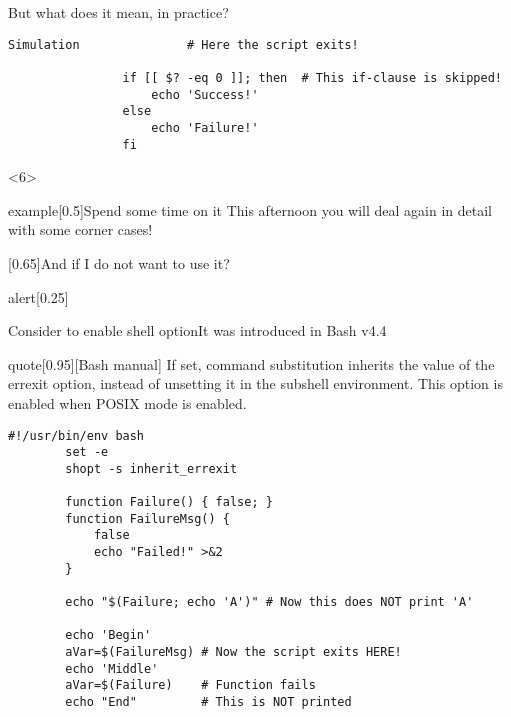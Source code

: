 \begin{frame}[fragile]{But what does it mean, in practice?}
\begin{overlayarea}{\textwidth}{0.7\textheight}
\begin{onlyenv}
\begin{lstlisting}[style=myBash]
                Simulation               # Here the script exits!

                if [[ $? -eq 0 ]]; then  # This if-clause is skipped!
                    echo 'Success!'
                else
                    echo 'Failure!'
                fi
            \end{lstlisting}
        \end{onlyenv}
        \begin{onlyenv}<6>
            \large
            \begin{varblock}{example}[0.5\textwidth]{Spend some time on it}
                This afternoon you will deal again in detail with some corner cases!
            \end{varblock}
            \begin{varblock}{}[0.65\textwidth]{And if I do not want to use it?}
                \large {}
            \end{varblock}
            \vspace*{-1mm}
            \begin{varblock}{alert}[0.25\textwidth]{}
            \end{varblock}
        \end{onlyenv}
    \end{overlayarea}
\end{frame}
\begin{frame}[fragile]{Consider to enable \;\; shell option}{It was introduced in Bash v4.4}
    \vspace{-3mm}
    \begin{varblock}{quote}[0.95\textwidth]{}[Bash manual]
        If set, command substitution inherits the value of the errexit option, instead of unsetting it in the subshell environment.
        This option is enabled when POSIX mode is enabled.
    \end{varblock}
    \begin{lstlisting}[style=myBash]
        #!/usr/bin/env bash
        set -e
        shopt -s inherit_errexit

        function Failure() { false; }
        function FailureMsg() {
            false
            echo "Failed!" >&2
        }

        echo "$(Failure; echo 'A')" # Now this does NOT print 'A'

        echo 'Begin'
        aVar=$(FailureMsg) # Now the script exits HERE!
        echo 'Middle'
        aVar=$(Failure)    # Function fails
        echo "End"         # This is NOT printed
    \end{lstlisting}
\end{frame}
